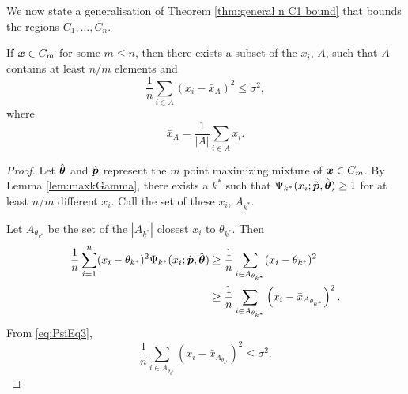 	
	We now state a generalisation of Theorem \ref{thm:general n C1 bound} that bounds the regions $C_1, \dots, C_n$.

	\label{sec:bounding Cm}
		\begin{theorem}
			If ${\bm{{x}}} \in C_m$ for some $m \leq n$, then there exists a subset of the $x_i$, $A$, such that $A$ contains at least $n/m$ elements and
			\begin{equation}
				\frac{1}{n} \sum_{i \in A} \left(x_i - \bar{x}_A\right)^2 \leq \sigma^2,
			\end{equation}
			where
			\begin{equation}
				\bar{x}_A = \frac{1}{|A|}\sum_{i \in A} x_i.
			\end{equation}
			\label{thm:general n constraints result}
		\end{theorem}
		\begin{proof}
			Let $\hat{{\bm{{\theta}}}}$ and $\hat{{\bm{{p}}}}$ represent the $m$ point maximizing mixture of ${\bm{{x}}} \in C_m$. By Lemma \ref{lem:maxkGamma}, there exists a $k^*$ such that $\Psi_{k^*}(x_i;\hat{{\bm{{p}}}},\hat{{\bm{{\theta}}}}) \geq 1$ for at least $n / m$ different $x_i$. Call the set of these $x_i$, $A_{k^*}$.

			Let $A_{\theta_{k^*}}$ be the set of the $|A_{k^*}|$ closest $x_i$ to $\theta_{k^*}$. Then
			\begin{align}
				\frac{1}{n} \sum_{i=1}^n (x_i - \theta_{k^*})^2 \Psi_{k^*}(x_i; \hat{{\bm{{p}}}},\hat{{\bm{{\theta}}}}) &\geq \frac{1}{n} \sum_{i \in A_{\theta_{k^*}}} (x_i - \theta_{k^*})^2 \\
				&\geq \frac{1}{n} \sum_{i \in A_{\theta_{k^*}}} \left(x_i - \bar{x}_{A_{\theta_{k^*}}}\right)^2.
			\end{align}
			From \eqref{eq:PsiEq3},
			\begin{equation}
				\frac{1}{n} \sum_{i \in A_{\theta_{k^*}}} \left(x_i - \bar{x}_{A_{\theta_{k^*}}}\right)^2 \leq \sigma^2.
			\end{equation}
		\end{proof}		

